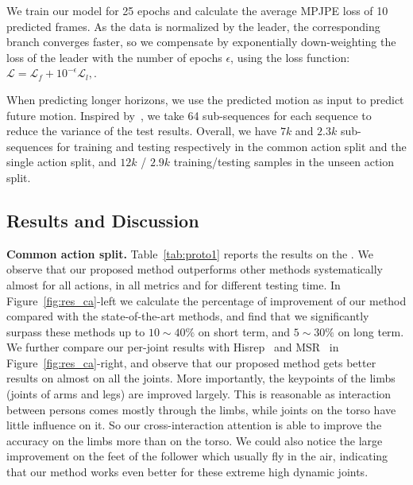 We train our model for 25 epochs and calculate the average MPJPE loss of 10 predicted frames. As the data is normalized by the leader, the corresponding branch converges faster, so we compensate by exponentially down-weighting the loss of the leader with the number of epochs $\epsilon$, using the loss function: $\mathcal{L} = \mathcal{L}_{f} + 10^{-\epsilon}\mathcal{L}_{l},$.

When predicting longer horizons, we use the predicted motion as input to predict future motion. {Inspired by~\cite{mao2020history}, we take 64 sub-sequences for each sequence to reduce the variance of the test results.} Overall, we have $7k$ and $2.3k$ sub-sequences for training and testing respectively in the {common action split} and {the single action split}, and $12k$ / $2.9k$  training/testing samples in the {unseen action split}.



\vspace{-2mm}
\subsection{Results and Discussion}
\label{sec:res_proto1}

\vspace{-1mm}
\noindent\textbf{Common action split.} 
Table~\ref{tab:proto1} reports the results  on the . We observe that our proposed method outperforms other methods systematically almost for all actions, in all metrics and for different testing time. 
In Figure~\ref{fig:res_ca}-left we calculate the percentage of improvement of our method compared with the state-of-the-art methods, and find that we significantly surpass these methods up to $10\sim40\%$ on short term,  and $5\sim30\%$ on long term. 
We further compare our per-joint results with Hisrep~\cite{mao2020history} and MSR~\cite{Dang_2021_ICCV} in Figure~\ref{fig:res_ca}-right, and observe that our proposed method gets better results on almost on all the joints. More importantly, the keypoints of the limbs (joints of arms and legs) are improved largely. This is reasonable as interaction between persons comes mostly through the limbs, while joints on the torso have little influence on it. So our cross-interaction attention is able to improve the accuracy on the limbs more than on the torso. We could also notice the large improvement on the feet of the follower which usually fly in the air, indicating that our method works even better for these extreme high dynamic joints.  

